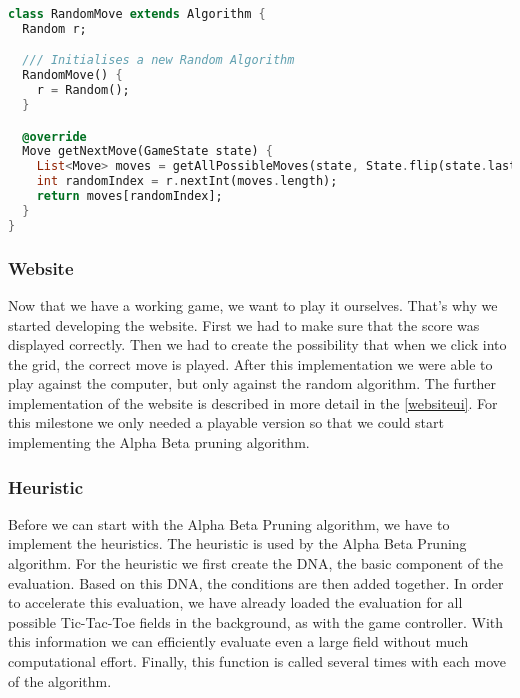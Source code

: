 \begin{lstlisting}[language=Dart,caption={Implementation of the \texttt{RandomMove}}]
class RandomMove extends Algorithm {
  Random r;

  /// Initialises a new Random Algorithm
  RandomMove() {
    r = Random();
  }

  @override
  Move getNextMove(GameState state) {
    List<Move> moves = getAllPossibleMoves(state, State.flip(state.lastMove.state));
    int randomIndex = r.nextInt(moves.length);
    return moves[randomIndex];
  }
}
\end{lstlisting}

\subsubsection{Website}
Now that we have a working game, we want to play it ourselves. That's why we started developing the website. First we had to make sure that the score was displayed correctly. Then we had to create the possibility that when we click into the grid, the correct move is played. After this implementation we were able to play against the computer, but only against the random algorithm. The further implementation of the website is described in more detail in the \autoref{websiteui}. For this milestone we only needed a playable version so that we could start implementing the Alpha Beta pruning algorithm.

\subsubsection{Heuristic}
Before we can start with the Alpha Beta Pruning algorithm, we have to implement the heuristics. The heuristic is used by the Alpha Beta Pruning algorithm. For the heuristic we first create the DNA, the basic component of the evaluation. Based on this DNA, the conditions are then added together. In order to accelerate this evaluation, we have already loaded the evaluation for all possible Tic-Tac-Toe fields in the background, as with the game controller. With this information we can efficiently evaluate even a large field without much computational effort. Finally, this function is called several times with each move of the algorithm.

